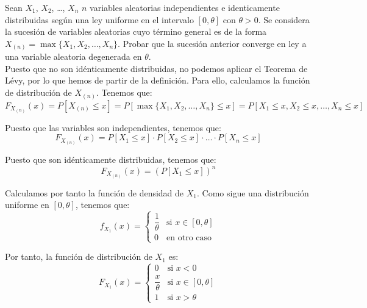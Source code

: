 \documentclass[12pt]{article}
\begin{document}
    \begin{ejercicio}[1 punto]
        Sean $X_1$, $X_2$, \ldots, $X_n$ $n$ variables aleatorias independientes e identicamente distribuidas según una ley uniforme en el intervalo $[0,\theta]$ con $\theta > 0$. Se considera la sucesión de variables aleatorias cuyo término general es de la forma $X_{(n)} = \max\{X_1, X_2, \ldots, X_n\}$. Probar que la sucesión anterior converge en ley a una variable aleatoria degenerada en $\theta$.\\

        Puesto que no son idénticamente distribuidas, no podemos aplicar el Teorema de Lévy, por lo que hemos de partir de la definición. Para ello, calculamos la función de distribución de $X_{(n)}$. Tenemos que:
        \begin{equation*}
            F_{X_{(n)}}(x) = P[X_{(n)}\leq x] = P[\max\{X_1,X_2,\ldots,X_n\}\leq x] = P[X_1\leq x, X_2\leq x,\ldots,X_n\leq x]
        \end{equation*}

        Puesto que las variables son independientes, tenemos que:
        \begin{equation*}
            F_{X_{(n)}}(x) = P[X_1\leq x]\cdot P[X_2\leq x]\cdot \ldots \cdot P[X_n\leq x]
        \end{equation*}

        Puesto que son idénticamente distribuidas, tenemos que:
        \begin{equation*}
            F_{X_{(n)}}(x) = \left(P[X_1\leq x]\right)^n
        \end{equation*}

        Calculamos por tanto la función de densidad de $X_1$. Como sigue una distribución uniforme en $[0,\theta]$, tenemos que:
        \begin{equation*}
            f_{X_1}(x) = \begin{cases}
                \dfrac{1}{\theta} & \text{si } x\in [0,\theta] \\
                0 & \text{en otro caso}
            \end{cases}
        \end{equation*}

        Por tanto, la función de distribución de $X_1$ es:
        \begin{equation*}
            F_{X_1}(x) = \begin{cases}
                0 & \text{si } x<0 \\
                \dfrac{x}{\theta} & \text{si } x\in [0,\theta] \\
                1 & \text{si } x>\theta
            \end{cases}
        \end{equation*}


\end{ejercicio}
\end{document}
